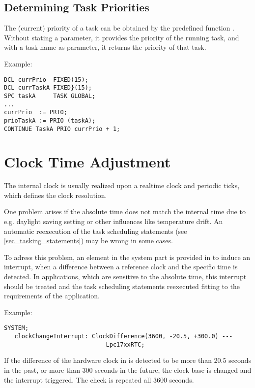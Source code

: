 \subsection{Determining Task Priorities}   %

The (current) priority of a task can be obtained by the predefined
function .
 Without stating a parameter, it provides the priority of
the running task, and with a task name as parameter, it returns the
priority of that task.

Example:

\begin{lstlisting}
DCL currPrio  FIXED(15);
DCL currTaskA FIXED}(15);
SPC taskA     TASK GLOBAL;
...
currPrio  := PRIO;
prioTaskA := PRIO (taskA);
CONTINUE TaskA PRIO currPrio + 1;
\end{lstlisting}

\section{Clock Time Adjustment}

The internal clock is usually realized upon a realtime clock and 
periodic ticks, which defines the clock resolution. 

One problem arises if the absolute time does not
match the internal time  due to e.g.
daylight saving setting or other influences like temperature  drift.
An automatic reexecution of the task scheduling statements
 (see \ref{sec_tasking_statements})
may be wrong in some cases. 

To adress this problem, 
an element in the system part is provided in \OpenPEARL{}
to induce an interrupt, when a difference between a reference clock and
the \OpenPEARL{} specific time is detected.
In applications, which are sensitive
to the absolute time, this  interrupt should be treated 
and the task scheduling
statements reexecuted fitting to the requirements of the application.

Example:

\begin{lstlisting}
SYSTEM;
   clockChangeInterrupt: ClockDifference(3600, -20.5, +300.0) ---
                             Lpc17xxRTC;
\end{lstlisting}

If the difference of the hardware clock in  is detected
 to be 
more than 20.5 seconds in the past, or more than 300 seconds in the future,
the \OpenPEARL{} clock base is changed and the interrupt triggered.
The check is repeated all 3600 seconds.

